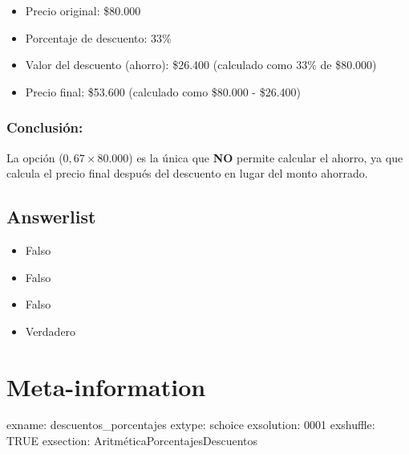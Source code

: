 \documentclass[
]{article}
\providecommand{\tightlist}{%
  \setlength{\itemsep}{0pt}\setlength{\parskip}{0pt}}
\begin{document}
\begin{itemize}
\tightlist
\item
  Precio original: \$80.000
\item
  Porcentaje de descuento: 33\%
\item
  Valor del descuento (ahorro): \$26.400 (calculado como 33\% de
  \$80.000)
\item
  Precio final: \$53.600 (calculado como \$80.000 - \$26.400)
\end{itemize}

\subsubsection{Conclusión:}\label{conclusiuxf3n}

La opción (\(0,67 \times 80.000\)) es la única que \textbf{NO} permite
calcular el ahorro, ya que calcula el precio final después del descuento
en lugar del monto ahorrado.

\subsection{Answerlist}\label{answerlist-1}

\begin{itemize}
\tightlist
\item
  Falso
\item
  Falso
\item
  Falso
\item
  Verdadero
\end{itemize}

\section{Meta-information}\label{meta-information}

exname: descuentos\_porcentajes extype: schoice exsolution: 0001
exshuffle: TRUE exsection:
Aritmética\textbar Porcentajes\textbar Descuentos
\end{document}
